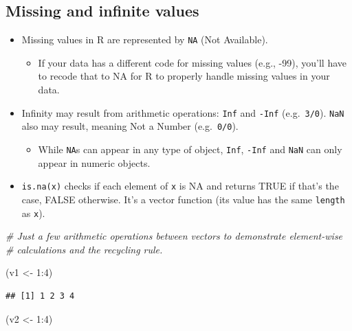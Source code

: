 \documentclass[
]{book}
\newenvironment{Shaded}{\begin{snugshade}}{\end{snugshade}}
\newcommand{\CommentTok}[1]{\textcolor[rgb]{0.56,0.35,0.01}{\textit{#1}}}
\newcommand{\DecValTok}[1]{\textcolor[rgb]{0.00,0.00,0.81}{#1}}
\newcommand{\NormalTok}[1]{#1}
\newcommand{\OtherTok}[1]{\textcolor[rgb]{0.56,0.35,0.01}{#1}}
\newcommand{\SpecialCharTok}[1]{\textcolor[rgb]{0.00,0.00,0.00}{#1}}
\providecommand{\tightlist}{%
  \setlength{\itemsep}{0pt}\setlength{\parskip}{0pt}}
\begin{document}
\hypertarget{missing-and-infinite-values}{%
\subsection{Missing and infinite values}\label{missing-and-infinite-values}}

\begin{itemize}
\tightlist
\item
  Missing values in R are represented by \texttt{NA} (Not Available).

  \begin{itemize}
  \tightlist
  \item
    If your data has a different code for missing values (e.g., -99), you'll have to recode that to NA for R to properly handle missing values in your data.
  \end{itemize}
\item
  Infinity may result from arithmetic operations: \texttt{Inf} and \texttt{-Inf} (e.g.~\texttt{3/0}). \texttt{NaN} also may result, meaning Not a Number (e.g.~\texttt{0/0}).

  \begin{itemize}
  \tightlist
  \item
    While \texttt{NA}s can appear in any type of object, \texttt{Inf}, \texttt{-Inf} and \texttt{NaN} can only appear in numeric objects.
  \end{itemize}
\item
  \texttt{is.na(x)} checks if each element of \texttt{x} is NA and returns TRUE if that's the case, FALSE otherwise. It's a vector function (its value has the same \texttt{length} as \texttt{x}).
\end{itemize}

\begin{Shaded}
\begin{Highlighting}[]
\CommentTok{\# Just a few arithmetic operations between vectors to demonstrate element{-}wise}
\CommentTok{\# calculations and the recycling rule.}

\NormalTok{(v1 }\OtherTok{\textless{}{-}} \DecValTok{1}\SpecialCharTok{:}\DecValTok{4}\NormalTok{)}
\end{Highlighting}
\end{Shaded}

\begin{verbatim}
## [1] 1 2 3 4
\end{verbatim}

\begin{Shaded}
\begin{Highlighting}[]
\NormalTok{(v2 }\OtherTok{\textless{}{-}} \DecValTok{1}\SpecialCharTok{:}\DecValTok{4}\NormalTok{)}
\end{Highlighting}
\end{Shaded}
\end{document}
